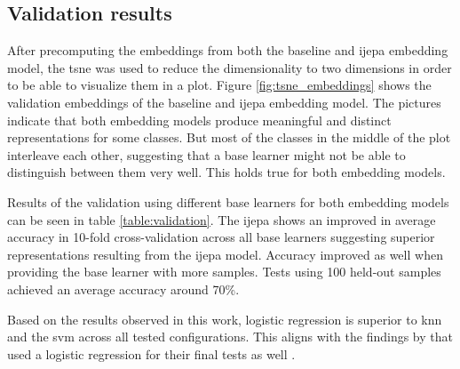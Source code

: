 \subsection{Validation results}
\label{sec:validation_results}

After precomputing the embeddings from both the baseline and \gls{ijepa} embedding model, the \gls{tsne} was used 
to reduce the dimensionality to two dimensions in order to be able to visualize them in a plot. 
Figure \ref{fig:tsne_embeddings} shows the validation embeddings of the baseline and \gls{ijepa} embedding model.
The pictures indicate that both embedding models produce meaningful and distinct representations for some classes. 
But most of the classes in the middle of the plot interleave each other, suggesting that a base learner might not be 
able to distinguish between them very well. This holds true for both embedding models.

Results of the validation using different base learners for both embedding models can be seen in table 
\ref{table:validation}. The \gls{ijepa} shows an improved in average accuracy in 10-fold cross-validation 
across all base learners suggesting superior representations resulting from the \gls{ijepa} model. 
Accuracy improved as well when providing the base learner with more samples. Tests using 100 held-out samples
achieved an average accuracy around 70\%.

Based on the results observed in this work, logistic regression is superior to \gls{knn} and the \gls{svm}
across all tested configurations. This aligns with the findings by \citeauthor{tian_rethinking_2020} that 
used a logistic regression for their final tests as well \cite{tian_rethinking_2020}.

